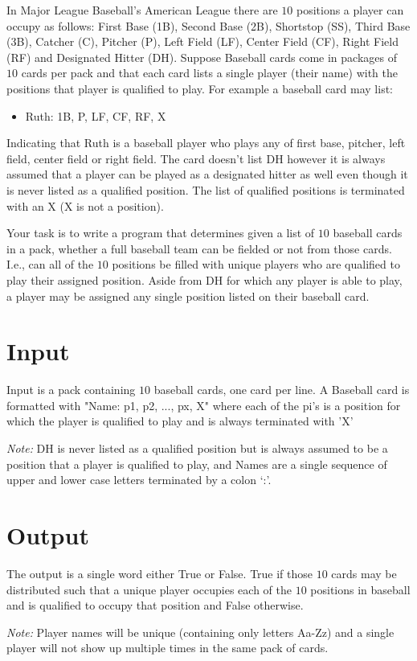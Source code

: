 
In Major League Baseball's American League there are $10$ positions a player can occupy as follows: First Base (1B), Second Base (2B), Shortstop (SS), Third Base (3B), Catcher (C), Pitcher (P), Left Field (LF), Center Field (CF), Right Field (RF) and Designated Hitter (DH). Suppose Baseball cards come in packages of $10$ cards per pack and that each card lists a single player (their name) with the positions that player is qualified to play. For example a baseball card may list:
\begin{itemize}
\item Ruth: 1B, P, LF, CF, RF, X
\end{itemize}
Indicating that Ruth is a baseball player who plays any of first base, pitcher, left field, center field or right field. The card doesn't list DH however it is always assumed that a player can be played as a designated hitter as well even though it is never listed as a qualified position. The list of qualified positions is terminated with an X (X is not a position).

Your task is to write a program that determines given a list of $10$ baseball cards in a pack, whether a full baseball team can be fielded or not from those cards. I.e., can all of the $10$ positions be filled with unique players who are qualified to play their assigned position. Aside from DH for which any player is able to play, a player may be assigned any single position listed on their baseball card.

\section*{Input}
Input is a pack containing $10$ baseball cards, one card per line. A
Baseball card is formatted with "Name: p1, p2, ..., px, X" where each
of the pi’s is a position for which the player is qualified to play
and is always terminated with 'X'

\emph{Note:} DH is never listed as a qualified position but is always assumed to be a position that a player is qualified to play, and Names are a single sequence of upper and lower case letters terminated by a colon ‘:’.

\section*{Output}
The output is a single word either True or False. True if those $10$ cards may be distributed such that a unique player occupies each of the $10$ positions in baseball and is qualified to occupy that position and False otherwise.

\emph{Note:} Player names will be unique (containing only letters Aa-Zz) and a single player will not show up multiple times in the same pack of cards.
